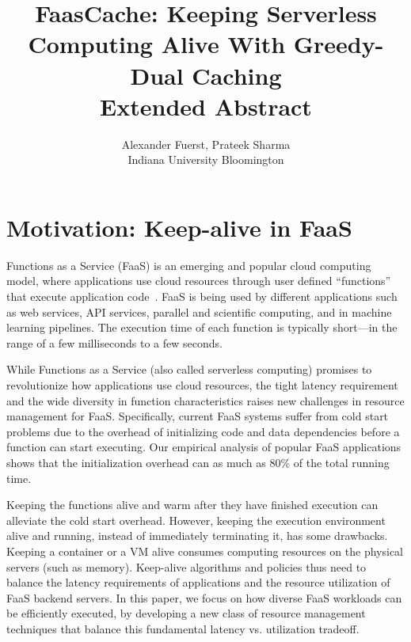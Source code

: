 \documentclass[pageno]{jpaper}
\begin{document}

\title{FaasCache: Keeping Serverless Computing Alive With Greedy-Dual Caching \\
Extended Abstract}

\date{}

\author{Alexander Fuerst, Prateek Sharma \\
Indiana University Bloomington}

\maketitle 

\thispagestyle{empty}

\section{Motivation: Keep-alive in FaaS}
\vspace*{\subsecspace}
Functions as a Service (FaaS) is an emerging and popular cloud computing model, where applications use cloud resources through user defined ``functions'' that execute application code~\cite{jonas_cloud_2019}.
%
FaaS is being used by different applications such as web services, API services, parallel and scientific computing, and in machine learning pipelines. 
%
The execution time of each function is typically short---in the range of a few milliseconds to a few seconds. 


While Functions as a Service (also called serverless computing) promises to revolutionize how applications use cloud resources, the tight latency requirement and the wide diversity in function characteristics raises new challenges in resource management for FaaS. 
%
Specifically, current FaaS systems suffer from cold start problems due to the overhead of initializing code and data dependencies before a function can start executing.
Our empirical analysis of popular FaaS applications shows that the initialization overhead can as much as 80\% of the total running time. 

Keeping the functions alive and warm after they have finished execution can alleviate the cold start overhead.  
However, keeping the execution environment alive and running, instead of immediately terminating it, has some drawbacks. 
Keeping a container or a VM alive consumes computing resources on the physical servers (such as memory). 
Keep-alive algorithms and policies thus need to balance the latency requirements of applications and the resource utilization of FaaS backend servers.
%
In this paper, we focus on how diverse FaaS workloads can be efficiently executed, by developing a new class of resource management techniques that balance this fundamental latency vs. utilization tradeoff. 
\end{document}
